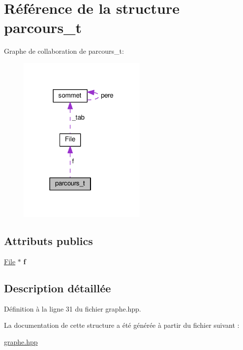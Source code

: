 \hypertarget{structparcours__t}{\section{Référence de la structure parcours\+\_\+t}
\label{structparcours__t}
}


Graphe de collaboration de parcours\+\_\+t\+:\nopagebreak
\begin{figure}[H]
\begin{center}
\leavevmode
\includegraphics[width=177pt]{structparcours__t__coll__graph}
\end{center}
\end{figure}
\subsection*{Attributs publics}
\begin{DoxyCompactItemize}
\item 
\hypertarget{structparcours__t_a0bb6da520f00c8404b61c1e5c7cf577b}{\hyperlink{classFile}{File} $\ast$ {\bfseries f}}\label{structparcours__t_a0bb6da520f00c8404b61c1e5c7cf577b}

\end{DoxyCompactItemize}


\subsection{Description détaillée}


Définition à la ligne 31 du fichier graphe.\+hpp.



La documentation de cette structure a été générée à partir du fichier suivant \+:\begin{DoxyCompactItemize}
\item 
\hyperlink{graphe_8hpp}{graphe.\+hpp}\end{DoxyCompactItemize}
